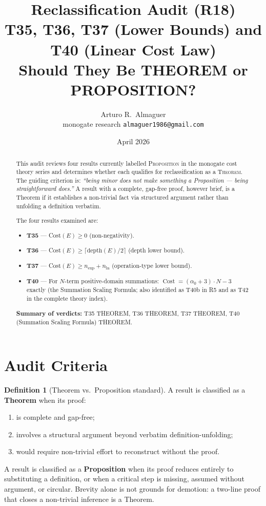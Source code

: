 \documentclass[12pt,a4paper]{article}
\title{Reclassification Audit (R18)\\[6pt]
       \large T35, T36, T37 (Lower Bounds) and T40 (Linear Cost Law)\\
       Should They Be THEOREM or PROPOSITION?}
\author{Arturo R.\ Almaguer\\
\small monogate research \quad \texttt{almaguer1986@gmail.com}}
\date{April 2026}
\theoremstyle{definition}
\newtheorem{definition}[theorem]{Definition}
\newcommand{\Cost}{\operatorname{Cost}}
\begin{document}
\maketitle

\begin{abstract}
This audit reviews four results currently labelled \textsc{Proposition}
in the monogate cost theory series and determines whether each qualifies
for reclassification as a \textsc{Theorem}.  The guiding criterion is:
\emph{``being minor does not make something a Proposition --- being
straightforward does.''}  A result with a complete, gap-free proof,
however brief, is a Theorem if it establishes a non-trivial fact via
structured argument rather than unfolding a definition verbatim.

The four results examined are:
\begin{itemize}
  \item \textbf{T35} --- Cost$(E) \geq 0$ (non-negativity).
  \item \textbf{T36} --- Cost$(E) \geq \lceil\mathrm{depth}(E)/2\rceil$
        (depth lower bound).
  \item \textbf{T37} --- Cost$(E) \geq n_{\exp} + n_{\ln}$
        (operation-type lower bound).
  \item \textbf{T40} --- For $N$-term positive-domain summations:
        $\Cost = (\alpha_0 + 3) \cdot N - 3$ exactly
        (the Summation Scaling Formula; also identified as T40b in R5
        and as T42 in the complete theory index).
\end{itemize}

\noindent\textbf{Summary of verdicts:} T35 THEOREM, T36 THEOREM, T37 THEOREM,
T40 (Summation Scaling Formula) THEOREM.
\end{abstract}

\tableofcontents
\bigskip

\section{Audit Criteria}

\begin{definition}[Theorem vs.\ Proposition standard]
A result is classified as a \textbf{Theorem} when its proof:
\begin{enumerate}
  \item is complete and gap-free;
  \item involves a structural argument beyond verbatim definition-unfolding;
  \item would require non-trivial effort to reconstruct without the proof.
\end{enumerate}
A result is classified as a \textbf{Proposition} when its proof reduces
entirely to substituting a definition, or when a critical step is missing,
assumed without argument, or circular.  Brevity alone is not grounds for
demotion: a two-line proof that closes a non-trivial inference is a Theorem.
\end{definition}
\end{document}
